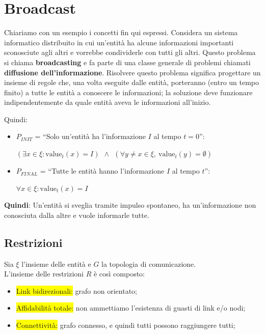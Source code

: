 \chapter{Broadcast}
Chiariamo con un esempio i concetti fin qui espressi. Considera un sistema
informatico distribuito in cui un'entità ha alcune informazioni importanti
sconosciute agli altri e vorrebbe condividerle con tutti gli altri. Questo
problema si chiama \textbf{broadcasting} e fa parte di una classe generale di
problemi chiamati \textbf{diffusione dell'informazione}. Risolvere questo
problema significa progettare un insieme di regole che, una volta eseguite dalle
entità, porteranno (entro un tempo finito) a tutte le entità a conoscere le
informazioni; la soluzione deve funzionare indipendentemente da quale entità
aveva le informazioni all'inizio.

Quindi:
\begin{itemize}
    \item $P_{INIT}$ = ``Solo un'entità ha l'informazione $I$ al tempo $t=0$'':
          \begin{center}
              $(\exists x \in \xi : \textrm{value}_t(x) = I) ~~ \wedge ~~ (\forall y
                  \neq x \in \xi,~\textrm{value}_t(y) = \emptyset)$
          \end{center}
    \item $P_{FINAL}$ = ``Tutte le entità hanno l'informazione $I$ al tempo $t$'':
          \begin{center}
              $\forall x \in \xi : \textrm{value}_t(x) = I$
          \end{center}
\end{itemize}

\textbf{Quindi}: Un'entità si sveglia tramite impulso spontaneo, ha
un'informazione non conosciuta dalla altre e vuole informarle tutte.

\section{Restrizioni}
Sia $\xi$ l'insieme delle entità e $G$ la topologia di comunicazione.\\
L'insieme delle restrizioni $R$ è così composto:
\begin{itemize}
    \item \colorbox{yellow}{Link bidirezionali:} grafo non orientato;
    \item \colorbox{yellow}{Affidabilità totale:} non ammettiamo l'esistenza di
          guasti di link e/o nodi;
    \item \colorbox{yellow}{Connettività:} grafo connesso, e quindi tutti possono
          raggiungere tutti;
\end{itemize}

